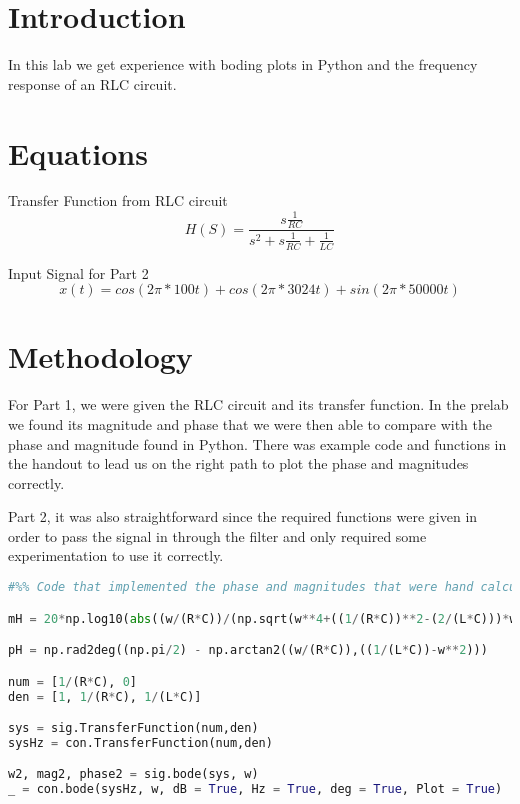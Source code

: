 \documentclass[12pt]{report}
\begin{document}
\section{Introduction}
 

In this lab we get experience with boding plots in Python and the frequency response of an RLC circuit.

\section{Equations}
Transfer Function from RLC circuit
\begin{equation*}
H(S)=\frac{s\frac{1}{RC}}{s^2+s\frac{1}{RC}+\frac{1}{LC}}
\end{equation*}

Input Signal for Part 2
\begin{equation*}
x(t) = cos(2\pi * 100t) + cos(2\pi *3024t)+sin(2\pi * 50000t)
\end{equation*}



\section{Methodology}

For Part 1, we were given the RLC circuit and its transfer function. In the prelab we found its magnitude and phase that we were then able to compare with the phase and magnitude found in Python. There was example code and functions in the handout to lead us on the right path to plot the phase and magnitudes correctly. 

Part 2, it was also straightforward since the required functions were given in order to pass the signal in through the filter and only required some experimentation to use it correctly. 

\begin{lstlisting}[language=Python]
#%% Code that implemented the phase and magnitudes that were hand calculated and Python's implentation to calculate the phase and magnitude of a transfer function. Also implements the frequency response in Hz using con.TransferFunction(). 

mH = 20*np.log10(abs((w/(R*C))/(np.sqrt(w**4+((1/(R*C))**2-(2/(L*C)))*w**2+(1/(L*C))**2))))

pH = np.rad2deg((np.pi/2) - np.arctan2((w/(R*C)),((1/(L*C))-w**2)))

num = [1/(R*C), 0]
den = [1, 1/(R*C), 1/(L*C)]

sys = sig.TransferFunction(num,den)
sysHz = con.TransferFunction(num,den)

w2, mag2, phase2 = sig.bode(sys, w)
_ = con.bode(sysHz, w, dB = True, Hz = True, deg = True, Plot = True)

\end{lstlisting}
\end{document}
